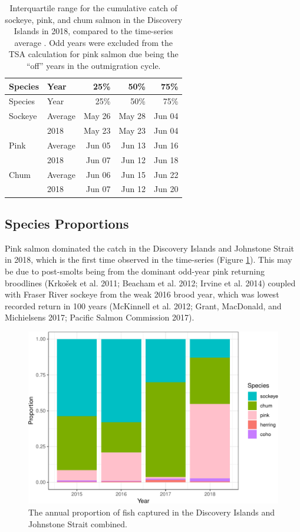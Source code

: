 \documentclass[fleqn,10pt]{wlpeerj} %
\begin{document}
\begin{longtable}[]{@{}llrrr@{}}
\caption{\label{tab:mtdi} Interquartile range for the cumulative catch of
sockeye, pink, and chum salmon in the Discovery Islands in 2018,
compared to the time-series average . Odd years were excluded from the
TSA calculation for pink salmon due being the ``off'' years in the
outmigration cycle.}\tabularnewline
\toprule
Species & Year & 25\% & 50\% & 75\%\tabularnewline
\midrule
\endfirsthead
\toprule
Species & Year & 25\% & 50\% & 75\%\tabularnewline
\midrule
\endhead
Sockeye & Average & May 26 & May 28 & Jun 04\tabularnewline
~ & 2018 & May 23 & May 23 & Jun 04\tabularnewline
Pink & Average & Jun 05 & Jun 13 & Jun 16\tabularnewline
~ & 2018 & Jun 07 & Jun 12 & Jun 18\tabularnewline
Chum & Average & Jun 06 & Jun 15 & Jun 22\tabularnewline
~ & 2018 & Jun 07 & Jun 12 & Jun 20\tabularnewline
\bottomrule
\end{longtable}

\subsection*{Species Proportions}\label{species-proportions}

Pink salmon dominated the catch in the Discovery Islands and Johnstone
Strait in 2018, which is the first time observed in the time-series
(Figure \ref{fig:prop}). This may be due to post-smolts being from the
dominant odd-year pink returning broodlines (Krkošek et al. 2011;
Beacham et al. 2012; Irvine et al. 2014) coupled with Fraser River
sockeye from the weak 2016 brood year, which was lowest recorded return
in 100 years (McKinnell et al. 2012; Grant, MacDonald, and Michielsens
2017; Pacific Salmon Commission 2017).

\begin{figure}[H]
\includegraphics[width=0.8\linewidth]{peer_j_migration_dynamics_files/figure-latex/prop-1} \caption{The annual proportion of fish captured in the Discovery Islands and Johnstone Strait combined.}\label{fig:prop}
\end{figure}
\end{document}
